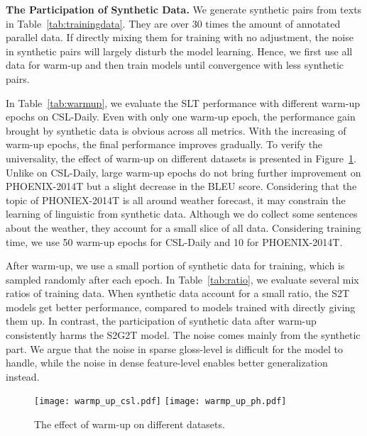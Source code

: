 \documentclass[final]{cvpr}
\begin{document}
\textbf{The Participation of Synthetic Data.} 
We generate synthetic pairs from texts in Table~\ref{tab:trainingdata}. 
They are over 30 times the amount of annotated parallel data. 
If directly mixing them for training with no adjustment, the noise in synthetic pairs will largely disturb the model learning. 
Hence, we first use all data for warm-up and then train models until convergence with less synthetic pairs. 

In Table~\ref{tab:warmup}, we evaluate the SLT performance with different warm-up epochs on CSL-Daily. 
Even with only one warm-up epoch, the performance gain brought by synthetic data is obvious across all metrics. 
With the increasing of warm-up epochs, the final performance improves gradually. 
To verify the universality, the effect of warm-up on different datasets is presented in Figure~\ref{fig:warmup}. 
Unlike on CSL-Daily, large warm-up epochs do not bring further improvement on PHOENIX-2014T but a slight decrease in the BLEU score. 
Considering that the topic of PHONIEX-2014T is all around weather forecast, 
it may constrain the learning of linguistic from synthetic data. 
Although we do collect some sentences about the weather, they account for a small slice of all data. 
Considering training time, we use 50 warm-up epochs for CSL-Daily and 10 for PHOENIX-2014T. 

After warm-up, we use a small portion of synthetic data for training, which is sampled randomly after each epoch. 
In Table~\ref{tab:ratio}, we evaluate several mix ratios of training data. 
When synthetic data account for a small ratio, the S2T models get better performance, compared to models trained with directly giving them up. 
In contrast, the participation of synthetic data after warm-up consistently harms the S2G2T model. 
The noise comes mainly from the synthetic part.  
We argue that the noise in sparse gloss-level is difficult for the model to handle, while the noise in dense feature-level enables better generalization instead. 

\begin{figure}[tp]
   \centering
   \texttt{[image: warmp\_up\_csl.pdf]}
   \texttt{[image: warmp\_up\_ph.pdf]}
   \caption{The effect of warm-up on different datasets.}\label{fig:warmup}
\end{figure}
\end{document}
